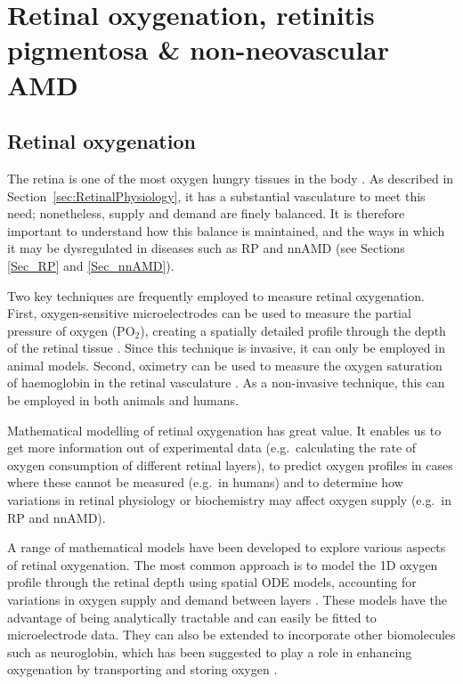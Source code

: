 \documentclass{article}
\begin{document}
\section{Retinal oxygenation, retinitis pigmentosa \& non-neovascular AMD}\label{Sec_Ox_RP_nnAMD}
%
%
\subsection{Retinal oxygenation}\label{Sec_Oxygen}
%
The retina is one of the most oxygen hungry tissues in the body \citep[per gram of tissue][]{Anderson_1968,Anderson_and_Saltzman_1964,Yu_and_Cringle_2001,W-Wirawan_and_Linsenmeier_2003}. As described in Section~\ref{sec:RetinalPhysiology}, it has a substantial vasculature to meet this need; nonetheless, supply and demand are finely balanced. It is therefore important to understand how this balance is maintained, and the ways in which it may be dysregulated in diseases such as RP and nnAMD (see Sections \ref{Sec_RP} and \ref{Sec_nnAMD}).

Two key techniques are frequently employed to measure retinal oxygenation. First, oxygen-sensitive microelectrodes can be used to measure the partial pressure of oxygen (PO$_2$), creating a spatially detailed profile through the depth of the retinal tissue \citep{Linsenmeier_and_Zhang_2017}. Since this technique is invasive, it can only be employed in animal models. Second, oximetry can be used to measure the oxygen saturation of haemoglobin in the retinal vasculature \citep{Linsenmeier_and_Zhang_2017}. As a non-invasive technique, this can be employed in both animals and humans.

Mathematical modelling of retinal oxygenation has great value. It enables us to get more information out of experimental data (e.g.\ calculating the rate of oxygen consumption of different retinal layers), to predict oxygen profiles in cases where these cannot be measured (e.g.\ in humans) and to determine how variations in retinal physiology or biochemistry may affect oxygen supply (e.g.\ in RP and nnAMD).

A range of mathematical models have been developed to explore various aspects of retinal oxygenation. The most common approach is to model the 1D oxygen profile through the retinal depth using spatial ODE models, accounting for variations in oxygen supply and demand between layers \citep[utilising anywhere between 1 and 8 model layers][]{Braun_et_al_1995,Cringle_and_Yu_2002,Dollery_et_al_1969,Haugh_et_al_1990,Linsenmeier_1986,Stefansson_1988}. These models have the advantage of being analytically tractable and can easily be fitted to microelectrode data. They can also be extended to incorporate other biomolecules such as neuroglobin, which has been suggested to play a role in enhancing oxygenation by transporting and storing oxygen \citep{Fago_et_al_2004_b,Roberts_et_al_2016a}.
\end{document}

